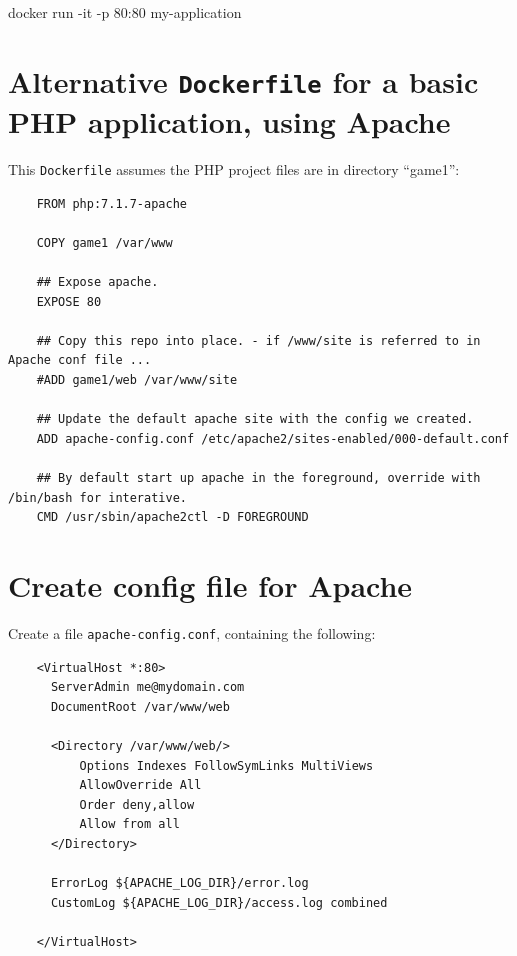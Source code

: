 \documentclass[a4paperpaper,openright]{book}
\newenvironment{Shaded}{}{}
\newcommand{\ExtensionTok}[1]{#1}
\newcommand{\NormalTok}[1]{#1}
\begin{document}
\begin{Shaded}
\begin{Highlighting}[]
    \ExtensionTok{docker}\NormalTok{ run -it -p 80:80 my-application}
\end{Highlighting}
\end{Shaded}

\hypertarget{alternative-dockerfile-for-a-basic-php-application-using-apache}{%
\section{\texorpdfstring{Alternative \texttt{Dockerfile} for a basic PHP
application, using
Apache}{Alternative Dockerfile for a basic PHP application, using Apache}}\label{alternative-dockerfile-for-a-basic-php-application-using-apache}}

This \texttt{Dockerfile} assumes the PHP project files are in directory
``game1'':

\begin{verbatim}
    FROM php:7.1.7-apache

    COPY game1 /var/www

    ## Expose apache.
    EXPOSE 80

    ## Copy this repo into place. - if /www/site is referred to in Apache conf file ...
    #ADD game1/web /var/www/site

    ## Update the default apache site with the config we created.
    ADD apache-config.conf /etc/apache2/sites-enabled/000-default.conf

    ## By default start up apache in the foreground, override with /bin/bash for interative.
    CMD /usr/sbin/apache2ctl -D FOREGROUND
\end{verbatim}

\hypertarget{create-config-file-for-apache}{%
\section{Create config file for
Apache}\label{create-config-file-for-apache}}

Create a file \texttt{apache-config.conf}, containing the following:

\begin{verbatim}
    <VirtualHost *:80>
      ServerAdmin me@mydomain.com
      DocumentRoot /var/www/web

      <Directory /var/www/web/>
          Options Indexes FollowSymLinks MultiViews
          AllowOverride All
          Order deny,allow
          Allow from all
      </Directory>

      ErrorLog ${APACHE_LOG_DIR}/error.log
      CustomLog ${APACHE_LOG_DIR}/access.log combined

    </VirtualHost>
\end{verbatim}
\end{document}
